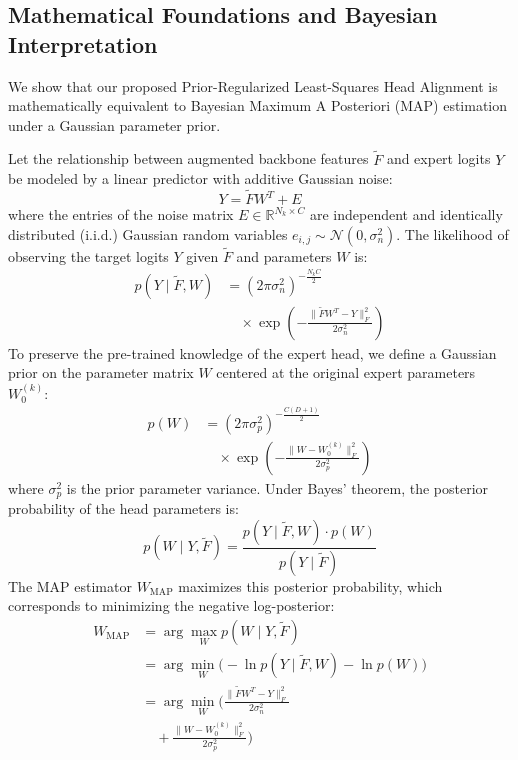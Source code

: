 \documentclass{article}
\theoremstyle{plain}
\theoremstyle{definition}
\theoremstyle{remark}
\begin{document}
\subsection{Mathematical Foundations and Bayesian Interpretation}
\label{sec:bayes}

We show that our proposed Prior-Regularized Least-Squares Head Alignment is mathematically equivalent to Bayesian Maximum A Posteriori (MAP) estimation under a Gaussian parameter prior.

Let the relationship between augmented backbone features $\tilde{F}$ and expert logits $Y$ be modeled by a linear predictor with additive Gaussian noise:
\begin{equation}
    Y = \tilde{F} W^T + E
\end{equation}
where the entries of the noise matrix $E \in \mathbb{R}^{N_k \times C}$ are independent and identically distributed (i.i.d.) Gaussian random variables $e_{i, j} \sim \mathcal{N}(0, \sigma^2_n)$. The likelihood of observing the target logits $Y$ given $\tilde{F}$ and parameters $W$ is:
\begin{align}
    p(Y \mid \tilde{F}, W) &= (2\pi \sigma^2_n)^{-\frac{N_k C}{2}} \nonumber \\
    &\quad \times \exp\left( - \frac{\|\tilde{F} W^T - Y\|_F^2}{2\sigma^2_n} \right)
\end{align}
To preserve the pre-trained knowledge of the expert head, we define a Gaussian prior on the parameter matrix $W$ centered at the original expert parameters $W_0^{(k)}$:
\begin{align}
    p(W) &= (2\pi \sigma^2_p)^{-\frac{C(D+1)}{2}} \nonumber \\
    &\quad \times \exp\left( - \frac{\|W - W_0^{(k)}\|_F^2}{2\sigma^2_p} \right)
\end{align}
where $\sigma^2_p$ is the prior parameter variance. Under Bayes' theorem, the posterior probability of the head parameters is:
\begin{equation}
    p(W \mid Y, \tilde{F}) = \frac{p(Y \mid \tilde{F}, W) \cdot p(W)}{p(Y \mid \tilde{F})}
\end{equation}
The MAP estimator $W_{\text{MAP}}$ maximizes this posterior probability, which corresponds to minimizing the negative log-posterior:
\begin{align}
    W_{\text{MAP}} &= \arg\max_{W} p(W \mid Y, \tilde{F}) \nonumber \\
    &= \arg\min_{W} \Big( -\ln p(Y \mid \tilde{F}, W) - \ln p(W) \Big) \nonumber \\
    &= \arg\min_{W} \Big( \frac{\|\tilde{F} W^T - Y\|_F^2}{2\sigma^2_n} \nonumber \\
    &\quad + \frac{\|W - W_0^{(k)}\|_F^2}{2\sigma^2_p} \Big)
\end{align}
\end{document}
